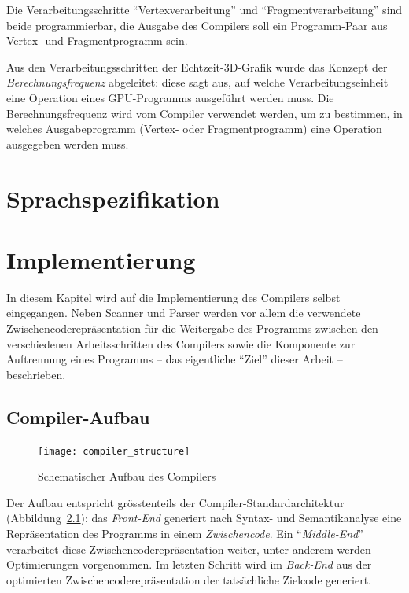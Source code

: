 \documentclass[twoside,a4paper,fleqn,12pt]{book}
\begin{document}
Die Verarbeitungsschritte "`Vertexverarbeitung"' und "`Fragmentverarbeitung"' sind beide programmierbar, die Ausgabe des Compilers
soll ein Programm-Paar aus Vertex- und Fragmentprogramm sein.

Aus den Verarbeitungsschritten der Echtzeit-3D-Grafik wurde das Konzept der \emph{Berechnungsfrequenz} abgeleitet:
diese sagt aus, auf welche Verarbeitungseinheit eine Operation eines GPU-Programms ausgeführt werden muss.
Die Berechnungsfrequenz wird vom Compiler verwendet werden, um zu bestimmen,
in welches Ausgabeprogramm (Vertex- oder Fragmentprogramm) eine Operation ausgegeben werden muss.

\chapter{Sprachspezifikation}
\label{langspec}



\chapter{Implementierung}
\label{implementation}

In diesem Kapitel wird auf die Implementierung des Compilers selbst eingegangen. 
Neben Scanner und Parser werden vor allem die verwendete Zwischencoderepräsentation
für die Weitergabe des Programms zwischen den verschiedenen Arbeitsschritten des Compilers 
sowie die Komponente zur Auftrennung eines Programms -- das eigentliche "`Ziel"' dieser Arbeit -- beschrieben.

\section{Compiler-Aufbau}
\begin{figure}[h]
   \centering
  \texttt{[image: compiler\_structure]}
  \caption{Schematischer Aufbau des Compilers}
  \label{fig:structure}
\end{figure}

Der Aufbau entspricht grösstenteils der Compiler-Standardarchitektur (Abbildung~\ref{fig:structure}): das \emph{Front-End} generiert nach Syntax- und Semantikanalyse
eine Repräsentation des Programms in einem \emph{Zwischencode}.
Ein "`\emph{Middle-End}"' verarbeitet diese Zwischencoderepräsentation weiter, unter anderem werden Optimierungen vorgenommen.
Im letzten Schritt wird im \emph{Back-End} aus der optimierten Zwischencoderepräsentation der tatsächliche Zielcode generiert.
\end{document}
